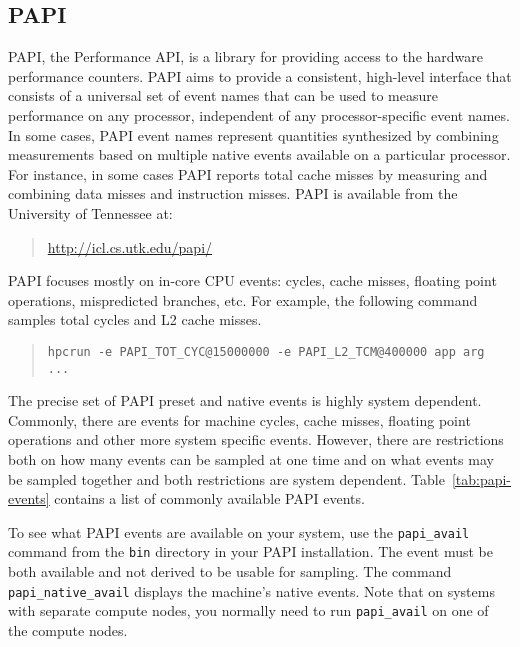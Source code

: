 \subsection{PAPI}

PAPI, the Performance API, is a library for providing access to the
hardware performance counters. PAPI aims to provide a
consistent, high-level interface that consists of a universal set of event names that can be used 
to measure performance on any processor, independent of any processor-specific event names. 
In some cases, PAPI event names
represent quantities synthesized by combining measurements based on multiple native events 
available on a particular processor.
For instance, in some cases PAPI reports
total cache misses by measuring and combining data misses and instruction misses. 
PAPI is available from the University of Tennessee at:

\begin{quote}
\url{http://icl.cs.utk.edu/papi/}
\end{quote}

PAPI focuses mostly on in-core CPU events: cycles, cache misses,
floating point operations, mispredicted branches, etc.  For example,
the following command samples total cycles and L2 cache misses.

\begin{quote}
\begin{verbatim}
hpcrun -e PAPI_TOT_CYC@15000000 -e PAPI_L2_TCM@400000 app arg ...
\end{verbatim}
\end{quote}

The precise set of PAPI preset and native events is highly system
dependent.  Commonly, there are events for machine cycles, cache
misses, floating point operations and other more system specific
events.  However, there are restrictions both on how many events can
be sampled at one time and on what events may be sampled together and
both restrictions are system dependent.  Table~\ref{tab:papi-events}
contains a list of commonly available PAPI events.

To see what PAPI events are available on your system, use the
\verb|papi_avail| command from the \verb|bin| directory in your PAPI
installation.  The event must be both available and not derived to be
usable for sampling.  The command \verb|papi_native_avail| displays
the machine's native events.  Note that on systems with separate
compute nodes, you normally need to run \verb|papi_avail| on one of
the compute nodes.

